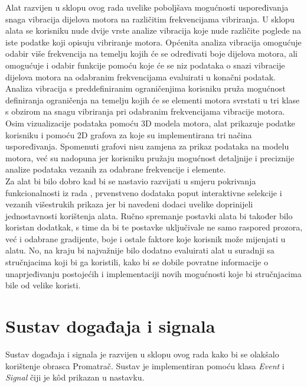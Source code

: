 \documentclass[times, utf8, diplomski]{fer}
\begin{document}
Alat razvijen u sklopu ovog rada uvelike poboljšava mogućnosti uspoređivanja snaga vibracija dijelova motora na različitim frekvencijama vibriranja. U sklopu alata se korisniku nude dvije vrste analize vibracija koje nude različite poglede na iste podatke koji opisuju vibriranje motora. Općenita analiza vibracija omogućuje odabir više frekvencija na temelju kojih će se određivati boje dijelova motora, ali omogućuje i odabir funkcije pomoću koje će se niz podataka o snazi vibracije dijelova motora na odabranim frekvencijama evaluirati u konačni podatak. Analiza vibracija s preddefiniranim ograničenjima korisniku pruža mogućnost definiranja ograničenja na temelju kojih će se elementi motora svrstati u tri klase s obzirom na snagu vibriranja pri odabranim frekvencijama vibracije motora. Osim vizualizacije podataka pomoću 3D modela motora, alat prikazuje podatke korisniku i pomoću 2D grafova za koje su implementirana tri načina uspoređivanja. Spomenuti grafovi nisu zamjena za prikaz podataka na modelu motora, već su nadopuna jer korisniku pružaju mogućnost detaljnije i preciznije analize podataka vezanih za odabrane frekvencije i elemente.\\

Za alat bi bilo dobro kad bi se nastavio razvijati u smjeru pokrivanja funkcionalnosti iz rada \citep{matkovic2021getting}, prvenstveno dodataka poput interaktivne selekcije i vezanih višestrukih prikaza jer bi navedeni dodaci uvelike doprinijeli jednostavnosti korištenja alata. Ručno spremanje postavki alata bi također bilo koristan dodatkak, s time da bi te postavke uključivale ne samo raspored prozora, već i odabrane gradijente, boje i ostale faktore koje korisnik može mijenjati u alatu. No, na kraju bi najvažnije bilo dodatno evaluirati alat u suradnji sa stručnjacima koji bi ga koristili, kako bi se dobile povratne informacije o unaprjeđivanju postojećih i implementaciji novih mogućnosti koje bi stručnjacima bile od velike koristi.




\appendix

\chapter{Sustav događaja i signala} \label{appendix:event-signal-system}

Sustav događaja i signala je razvijen u sklopu ovog rada kako bi se olakšalo korištenje obrasca Promatrač. Sustav je implementiran pomoću klasa \textit{Event} i  \textit{Signal} čiji je k\^{o}d prikazan u nastavku.\\
\end{document}
